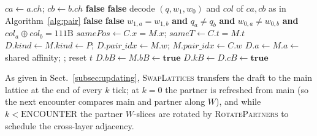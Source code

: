 \documentclass[a4paper]{article}
\begin{document}
\begin{algorithm}[htp]
\caption{cluster formation, electric/magnetic channels, and collapse (superposing and distinct bubbles).}
\label{alg:cluster}
\begin{algorithmic}[1]
\State $ca \gets a.ch$; $cb \gets b.ch$
 
\State \Return \textbf{false}
 
\State \Return \textbf{false}
\EndIf
\State decode $(q,w_{1},w_{0})$ and $col$ of $ca,cb$ as in Algorithm~\ref{alg:pair}
 
\State \Return \textbf{false}
 
\State \Return \textbf{false}
\EndIf
\State \Return $w_{1,a} = w_{1,b}$ \textbf{and} $q_a \neq q_b$ \textbf{and} $w_{0,a} \neq w_{0,b}$ \textbf{and} $col_a \oplus col_b = 111\mathrm{B}$ 
\EndFunction
{}
\State $samePos \gets C.x = M.x$; $sameT \gets C.t = M.t$
\State $D.kind \gets M.kind \gets P$; $D.pair\_idx \gets M.w$; $M.pair\_idx \gets C.w$ 
\State $D.a \gets M.a \gets$ shared affinity; ; reset $t$
\State $D.bB \gets M.bB \gets \textbf{true}$ 
\EndIf
{} 
 
\State $D.kB \gets D.cB \gets \textbf{true}$ 
\Else
\State {} 
\EndIf
\EndIf
\EndProcedure
\end{algorithmic}
\end{algorithm}
As given in Sect.~\ref{subsec:updating}, \textsc{SwapLattices} transfers the draft to the main lattice at the end of every $k$ tick; at $k=0$ the partner is refreshed from main (so the next encounter compares main and partner along $W$), and while $k<\mathrm{ENCOUNTER}$ the partner $W$-slices are rotated by \textsc{RotatePartners} to schedule the cross-layer adjacency.
\end{document}

